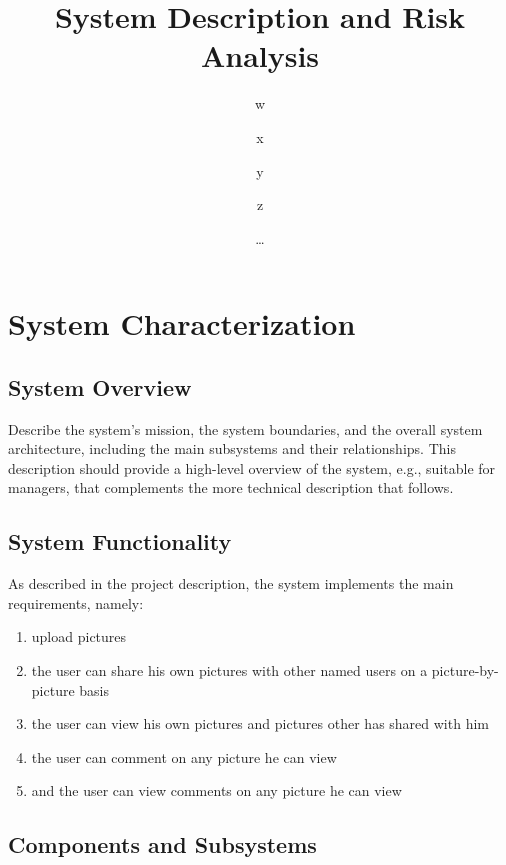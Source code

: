 \documentclass{article}
\title{\huge\sffamily\bfseries System Description and Risk Analysis}
\author{w \and x \and y \and z}
\date{\dots}
\begin{document}
\maketitle


\tableofcontents
\pagebreak


\section{System Characterization}

\subsection{System Overview}

Describe the system's mission,  the system boundaries,
and the overall system architecture, including the main subsystems and
their relationships.   This description should provide a high-level
overview of the system, e.g., suitable for managers, that complements
the more technical description that follows.


\subsection{System Functionality}

As described in the project description, the system implements the main requirements, namely:

\begin{enumerate}
\item upload pictures 
\item the user can share his own pictures with other named users on a picture-by-picture basis
\item the user can view his own pictures and pictures other has shared with him
\item the user can comment on any picture he can view
\item and the user can view comments on any picture he can view  
\end{enumerate}

    

\subsection{Components and Subsystems}
\end{document}
